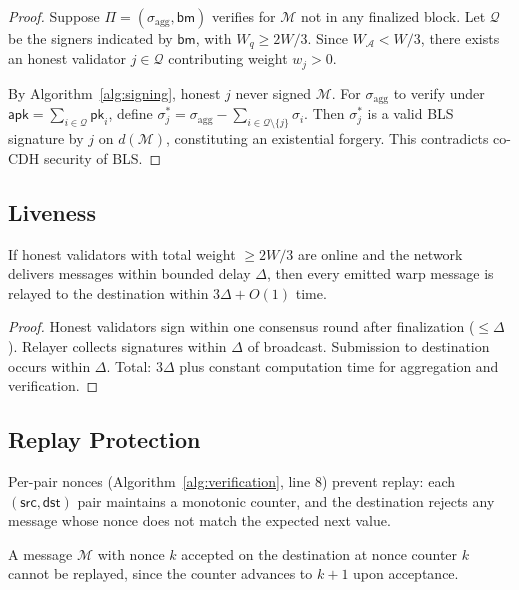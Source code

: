\begin{proof}
Suppose $\Pi = (\sigma_{\text{agg}}, \mathsf{bm})$ verifies for $\mathcal{M}$ not in any finalized block. Let $\mathcal{Q}$ be the signers indicated by $\mathsf{bm}$, with $W_q \geq 2W/3$. Since $W_{\mathcal{A}} < W/3$, there exists an honest validator $j \in \mathcal{Q}$ contributing weight $w_j > 0$.

By Algorithm~\ref{alg:signing}, honest $j$ never signed $\mathcal{M}$. For $\sigma_{\text{agg}}$ to verify under $\mathsf{apk} = \sum_{i \in \mathcal{Q}} \mathsf{pk}_i$, define $\sigma_j^* = \sigma_{\text{agg}} - \sum_{i \in \mathcal{Q} \setminus \{j\}} \sigma_i$. Then $\sigma_j^*$ is a valid BLS signature by $j$ on $d(\mathcal{M})$, constituting an existential forgery. This contradicts co-CDH security of BLS.
\end{proof}

\subsection{Liveness}

\begin{theorem}[Liveness]\label{thm:liveness}
If honest validators with total weight $\geq 2W/3$ are online and the network delivers messages within bounded delay $\Delta$, then every emitted warp message is relayed to the destination within $3\Delta + O(1)$ time.
\end{theorem}

\begin{proof}
Honest validators sign within one consensus round after finalization ($\leq \Delta$). Relayer collects signatures within $\Delta$ of broadcast. Submission to destination occurs within $\Delta$. Total: $3\Delta$ plus constant computation time for aggregation and verification.
\end{proof}

\subsection{Replay Protection}

Per-pair nonces (Algorithm~\ref{alg:verification}, line 8) prevent replay: each $(\mathsf{src}, \mathsf{dst})$ pair maintains a monotonic counter, and the destination rejects any message whose nonce does not match the expected next value.

\begin{lemma}[No Replay]
A message $\mathcal{M}$ with nonce $k$ accepted on the destination at nonce counter $k$ cannot be replayed, since the counter advances to $k+1$ upon acceptance.
\end{lemma}

